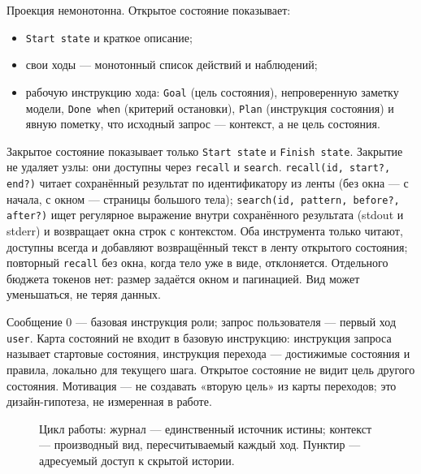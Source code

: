 \documentclass[11pt,a4paper]{article}
\begin{document}
Проекция немонотонна. Открытое состояние показывает:
\begin{itemize}[leftmargin=1.4em,itemsep=0.15em]
  \item \texttt{Start state} и краткое описание;
  \item свои ходы --- монотонный список действий и наблюдений;
  \item рабочую инструкцию хода: \texttt{Goal} (цель состояния), непроверенную заметку
  модели, \texttt{Done when} (критерий остановки), \texttt{Plan} (инструкция состояния) и
  явную пометку, что исходный запрос --- контекст, а не цель состояния.
\end{itemize}
Закрытое состояние показывает только \texttt{Start state} и \texttt{Finish state}.
Закрытие не удаляет узлы: они доступны через \texttt{recall} и \texttt{search}.
\texttt{recall(id, start?, end?)} читает сохранённый результат по идентификатору из ленты
(без окна --- с начала, с окном --- страницы большого тела); \texttt{search(id, pattern,
before?, after?)} ищет регулярное выражение внутри сохранённого результата (stdout и stderr)
и возвращает окна строк с контекстом. Оба инструмента только читают, доступны всегда и
добавляют возвращённый текст в ленту открытого состояния; повторный \texttt{recall} без
окна, когда тело уже в виде, отклоняется. Отдельного бюджета токенов нет: размер задаётся
окном и пагинацией. Вид может уменьшаться, не теряя данных.

Сообщение 0 --- базовая инструкция роли; запрос пользователя --- первый ход
\texttt{user}. Карта состояний не входит в базовую инструкцию: инструкция запроса называет
стартовые состояния, инструкция перехода --- достижимые состояния и правила, локально для
текущего шага. Открытое состояние не видит цель другого состояния. Мотивация --- не
создавать «вторую цель» из карты переходов; это дизайн-гипотеза, не измеренная в работе.

\begin{figure}[t]
\centering
{}
\caption{Цикл работы: журнал --- единственный источник истины; контекст --- производный
вид, пересчитываемый каждый ход. Пунктир --- адресуемый доступ к скрытой истории.}
\label{fig:cycle}
\end{figure}
\end{document}
